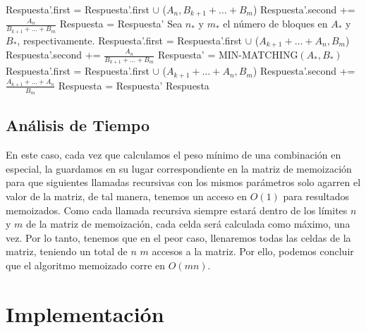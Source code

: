 \documentclass[12pt,a4,paper]{article}
\begin{document}
\begin{algorithmic}[1]
                \STATE Respuesta'.first = Respuesta'.first $\cup$ ($A_n, B_{k+1}+\ldots+B_m$)
                \STATE Respuesta'.second += $\frac{A_n}{B_{k+1}+\ldots+B_m}$
            \ENDIF
                \STATE Respuesta = Respuesta'
            \ENDIF
        \ENDFOR
        \STATE
         
             
            \STATE Sea $n_*$ y $m_*$ el número de bloques en $A_*$ y $B_*$, respectivamente.
                \STATE Respuesta'.first = Respuesta'.first $\cup$ ($A_{k+1} + \ldots + A_n, B_m$)
                \STATE Respuesta'.second += $\frac{A_n}{B_{k+1}+\ldots+B_m}$
            \ELSE
                \STATE Respuesta' = {\textsc{MIN-MATCHING}$(A_*, B_*)$}
                \STATE Respuesta'.first = Respuesta'.first $\cup$ ($A_{k+1} + \ldots + A_n, B_m$)
                \STATE Respuesta'.second += $\frac{A_{k+1} + \ldots + A_n}{B_m}$
            \ENDIF
                \STATE Respuesta = Respuesta'
            \ENDIF
        \ENDFOR
        \STATE
        \RETURN Respuesta
\end{algorithmic}

\subsection*{Análisis de Tiempo}

En este caso, cada vez que calculamos el peso mínimo de una combinación en especial, la guardamos en su lugar correspondiente en la matriz de memoización para que siguientes llamadas recursivas con los mismos parámetros solo agarren el valor de la matriz, de tal manera, tenemos un acceso en $O(1)$ para resultados memoizados. Como cada llamada recursiva siempre estará dentro de los límites $n$ y $m$ de la matriz de memoización, cada celda será calculada como máximo, una vez. Por lo tanto, tenemos que en el peor caso, llenaremos todas las celdas de la matriz, teniendo un total de $n$  $m$ accesos a la matriz. Por ello, podemos concluir que el algoritmo memoizado corre en $O(mn)$.

\section*{Implementación}
\end{document}
